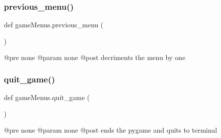 \subsubsection{\texorpdfstring{previous\+\_\+menu()}{previous\_menu()}}
{\footnotesize\ttfamily def game\+Menus.\+previous\+\_\+menu (\begin{DoxyParamCaption}{ }\end{DoxyParamCaption})}

\begin{DoxyVerb}@pre none
@param none
@post decriments the menu by one
\end{DoxyVerb}
 \mbox{\label{namespacegame_menus_a66dbbc5a74ad9c4a02f1661a10a69ad9}} 
\subsubsection{\texorpdfstring{quit\+\_\+game()}{quit\_game()}}
{\footnotesize\ttfamily def game\+Menus.\+quit\+\_\+game (\begin{DoxyParamCaption}{ }\end{DoxyParamCaption})}

\begin{DoxyVerb}@pre none
@param none
@post ends the pygame and quits to terminal
\end{DoxyVerb}
 